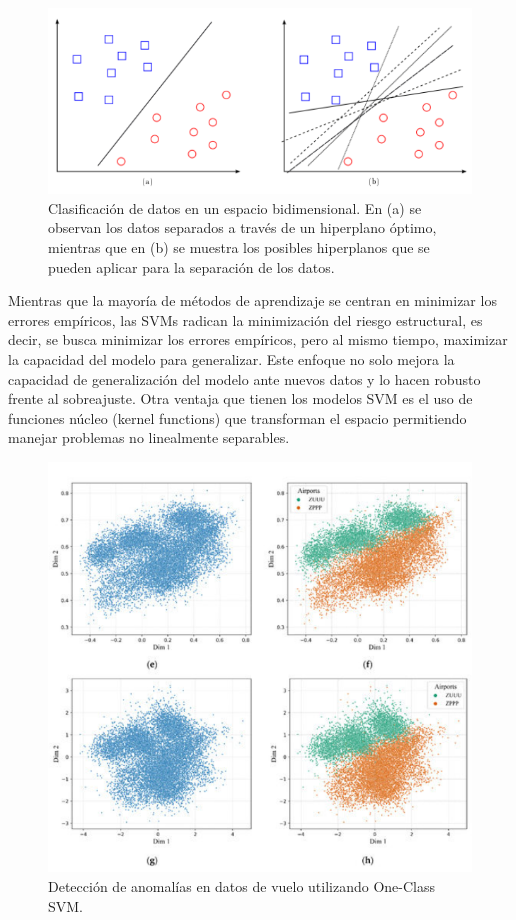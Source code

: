 \documentclass[11pt,a4paper,spanish]{book}
\numberwithin{equation}{chapter}
\numberwithin{figure}{chapter}
\begin{document}
\begin{figure}[h]
    \centering
    \includegraphics[width=1.0\textwidth]{media/svm-dm.png}
    \caption{Clasificación de datos en un espacio bidimensional. En (a) se observan 
    los datos separados a través de un hiperplano óptimo, mientras que en (b) se muestra 
    los posibles hiperplanos que se pueden aplicar para la separación de los datos.  
    \protect\cite{suarez2014svm} }
    \label{fig:figSVM}
\end{figure}


Mientras que la mayoría de métodos de aprendizaje se centran en minimizar los errores 
empíricos, las SVMs radican la minimización del riesgo estructural, es decir, se busca 
minimizar los errores empíricos, pero al mismo tiempo, maximizar la capacidad del modelo 
para generalizar. Este enfoque no solo mejora la capacidad de generalización del modelo 
ante nuevos datos y lo hacen robusto frente al sobreajuste. Otra ventaja que tienen los 
modelos SVM es el uso de funciones núcleo (kernel functions) que transforman el espacio 
permitiendo manejar problemas no linealmente separables. 


\begin{figure}[h]
    \centering
    \includegraphics[width=1.0\textwidth]{media/svm-kun.png}
    \caption{Detección de anomalías en datos de vuelo utilizando One-Class SVM.  
    \protect\cite{qin2022flight} }
    \label{fig:figSVMflight}
\end{figure}
\end{document}
